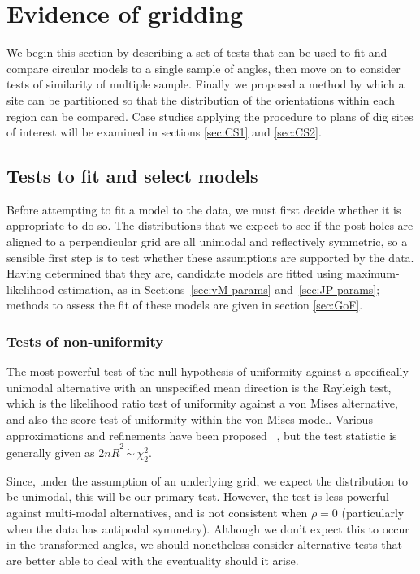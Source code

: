 \documentclass[../../ArchStats.tex]{subfiles}
\begin{document}
\section{Evidence of gridding}
\label{sec:gridding}
We begin this section by describing a set of tests that can be used to fit and compare circular models to a single sample of angles, then move on to consider tests of similarity of multiple sample. Finally we proposed a method by which a site can be partitioned so that the distribution of the orientations within each region can be compared. Case studies applying the procedure to plans of dig sites of interest will be examined in sections \ref{sec:CS1} and \ref{sec:CS2}.

\subsection{Tests to fit and select models}
\label{sec:model-fitting-tests}

Before attempting to fit a model to the data, we must first decide whether it is appropriate to do so. The distributions that we expect to see if the post-holes are aligned to a perpendicular grid are all unimodal and reflectively symmetric, so a sensible first step is to test whether these assumptions are supported by the data. Having determined that they are, candidate models are fitted using maximum-likelihood estimation, as in Sections~\ref{sec:vM-params} and~\ref{sec:JP-params}; methods to assess the fit of these models are given in section \ref{sec:GoF}.


\subsubsection{Tests of non-uniformity}
\label{sec:unif-tests}

The most powerful test of the null hypothesis of uniformity against a specifically unimodal alternative with an unspecified mean direction is the Rayleigh test, which is the likelihood ratio test of uniformity against a von Mises alternative, and also the score test of uniformity within the von Mises model. Various approximations and refinements have been proposed ~\cite{Mardia1999}, but the test statistic is generally given as $2n\bar{R}^2 \, \dot{\sim} \, \chi^2_2$.

Since, under the assumption of an underlying grid, we expect the distribution to be unimodal, this will be our primary test. However, the test is less powerful against multi-modal alternatives, and is not consistent when $\rho = 0$ (particularly when the data has antipodal symmetry). Although we don't expect this to occur in the transformed angles, we should nonetheless consider alternative tests that are better able to deal with the eventuality should it arise.
\end{document}
